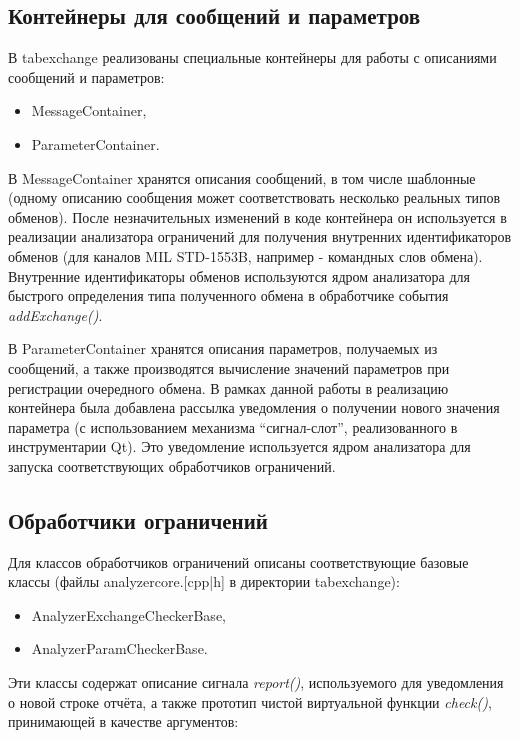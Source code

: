 \subsection{Контейнеры для сообщений и параметров}

В tabexchange реализованы специальные контейнеры для работы с описаниями 
сообщений и параметров:

\begin{itemize}
 \item MessageContainer,
 \item ParameterContainer.
\end{itemize}

В MessageContainer хранятся описания сообщений, в том числе шаблонные (одному 
описанию сообщения может соответствовать несколько реальных типов обменов). 
После незначительных изменений в коде контейнера он используется в реализации 
анализатора ограничений для получения внутренних идентификаторов обменов (для 
каналов MIL STD-1553B, например - командных слов обмена). Внутренние 
идентификаторы обменов используются ядром анализатора для быстрого определения 
типа полученного обмена в обработчике события \textit{addExchange()}.

В ParameterContainer хранятся описания параметров, получаемых из сообщений, а 
также производятся вычисление значений параметров при регистрации очередного 
обмена. В рамках данной работы в реализацию контейнера была добавлена рассылка 
уведомления о получении нового значения параметра (с использованием механизма 
``сигнал-слот'', реализованного в инструментарии Qt). Это уведомление 
используется ядром анализатора для запуска соответствующих обработчиков 
ограничений.

\subsection{Обработчики ограничений}

Для классов обработчиков ограничений описаны соответствующие базовые классы 
(файлы analyzercore.[cpp|h] в директории tabexchange):

\begin{itemize}
 \item AnalyzerExchangeCheckerBase,
 \item AnalyzerParamCheckerBase.
\end{itemize}

Эти классы содержат описание сигнала \textit{report()}, используемого для 
уведомления о новой строке отчёта, а также прототип чистой виртуальной функции 
\textit{check()}, принимающей в качестве аргументов:


